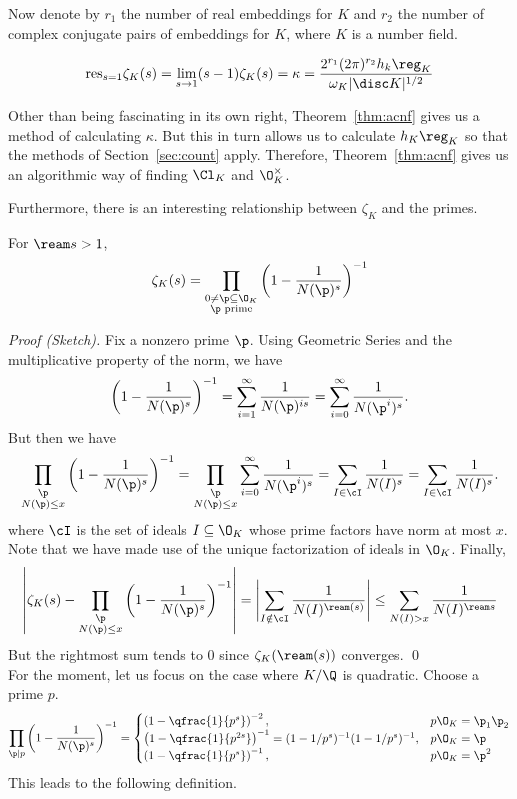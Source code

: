 Now denote by $r_1$ the number of real embeddings for $K$ and $r_2$ the number of complex conjugate pairs of embeddings for $K$, where $K$ is a number field. 


\begin{thm} \label{thm:acnf}
	\[
	\text{res}_{s=1} \zeta_K(s)= \lim_{s \to 1} (s-1)\zeta_K(s)= \kappa= \dfrac{2^{r_1} (2\pi)^{r_2} h_k \reg_K}{\omega_K |\disc K|^{1/2}}
	\]
\end{thm}

 Other than being fascinating in its own right, Theorem~\ref{thm:acnf} gives us a method of calculating $\kappa$. But this in turn allows us to calculate $h_K\reg_K$ so that the methods of Section~\ref{sec:count} apply. Therefore, Theorem~\ref{thm:acnf} gives us an algorithmic way of finding $\Cl_K$ and $\O_K^\times$. 


Furthermore, there is an interesting relationship between $\zeta_K$ and the primes.

\begin{thm}
For $\ream s>1$, 
	\[
	\zeta_K(s)= \prod_{\substack{0 \neq \p \subseteq \O_K \\ \p \text{ prime}}} \left( 1 - \dfrac{1}{N(\p)^s} \right)^{-1}
	\]
\end{thm}

\noindent\emph{Proof (Sketch). } Fix a nonzero prime $\p$. Using Geometric Series and the multiplicative property of the norm, we have
	\[
	\left(1 - \dfrac{1}{N(\p)^s} \right)^{-1} = \sum_{i=1}^\infty \dfrac{1}{N(\p)^{is}} = \sum_{i=0}^\infty \dfrac{1}{N(\p^i)^s}.
	\]
But then we have
	\[
	\prod_{\substack{\p \\ N(\p) \leq x}} \left(1 - \dfrac{1}{N(\p)^s} \right)^{-1} = \prod_{\substack{\p \\ N(\p) \leq x}} \sum_{i=0}^\infty \dfrac{1}{N(\p^i)^s} = \sum_{I \in \cI} \dfrac{1}{N(I)^s} = \sum_{I \in \cI} \dfrac{1}{N(I)^s}.
	\]
where $\cI$ is the set of ideals $I \subseteq \O_K$ whose prime factors have norm at most $x$. Note that we have made use of the unique factorization of ideals in $\O_K$. Finally,
	\[
	\left| \zeta_K(s) - \prod_{\substack{\p \\ N(\p) \leq x}} \left(1 - \dfrac{1}{N(\p)^s} \right)^{-1} \right| = \left| \sum_{I \notin \cI} \dfrac{1}{N(I)^{\ream(s)}} \right| \leq \sum_{N(I) > x} \dfrac{1}{N(I)^{\ream s}}
	\]
But the rightmost sum tends to 0 since $\zeta_K(\ream(s))$ converges. \qed \\


For the moment, let us focus on the case where $K/\Q$ is quadratic. Choose a prime $p$. 
	\[
	\prod_{\p \mid p} \left(1 - \dfrac{1}{N(\p)^s} \right)^{-1}=
	\begin{cases}
	\left(1- \qfrac{1}{p^s} \right)^{-2}, & p\O_K= \p_1\p_2 \\
	\left(1- \qfrac{1}{p^{2s}} \right)^{-1}= (1-1/p^s)^{-1}(1-1/p^s)^{-1}, & p\O_K=\p \\
	\left(1- \qfrac{1}{p^s} \right)^{-1}, & p\O_K=\p^2 
	\end{cases}
	\]
This leads to the following definition.

